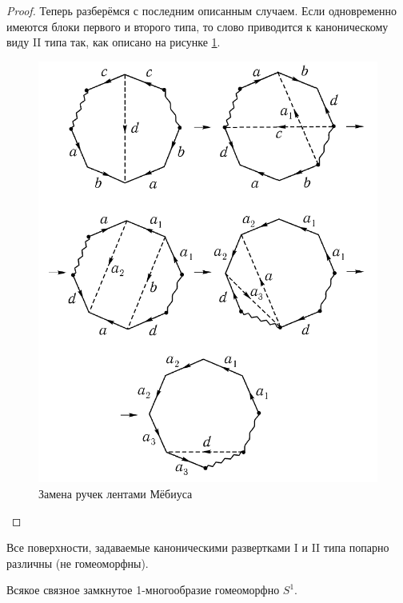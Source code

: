 \documentclass[12pt,a4paper]{article}
\begin{document}
\begin{proof}
        Теперь разберёмся с последним описанным случаем. Если одновременно имеются блоки первого и второго типа, то слово приводится к каноническому виду II типа так, как описано на рисунке \ref{surface_typisation_picture_6}.
        \begin{figure}[p]
            \centering
            \includegraphics[width=\textwidth]{GaT-4.png}
            \caption{Замена ручек лентами Мёбиуса}
            \label{surface_typisation_picture_6}
        \end{figure}
    \end{proof}

    \begin{theorem}
        Все поверхности, задаваемые каноническими развертками I и II типа попарно различны (не гомеоморфны).
    \end{theorem}

    \begin{theorem}
        Всякое связное замкнутое 1-многообразие гомеоморфно $S^1$.
    \end{theorem}
\end{document}
